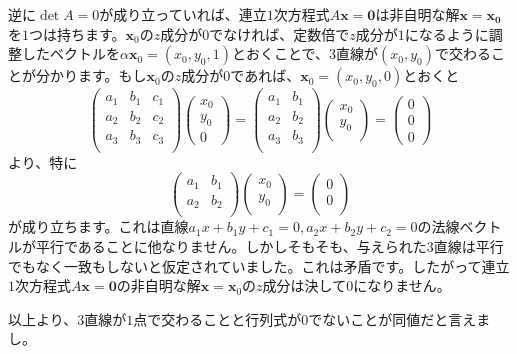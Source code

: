 逆に$\det A = 0$が成り立っていれば、連立$1$次方程式$A\bm{x} = \bm{0}$は非自明な解$\bm{x} = \bm{x_0}$を$1$つは持ちます。$\bm{x}_0$の$z$成分が$0$でなければ、定数倍で$z$成分が$1$になるように調整したベクトルを$\alpha \bm{x}_0 = (x_0, y_0, 1)$とおくことで、$3$直線が$(x_0, y_0)$で交わることが分かります。もし$\bm{x}_0$の$z$成分が$0$であれば、$\bm{x}_0 = (x_0, y_0, 0)$とおくと
\[
\begin{pmatrix}
a_1 & b_1 & c_1 \\
a_2 & b_2 & c_2 \\
a_3 & b_3 & c_3 \\
\end{pmatrix}
\begin{pmatrix}
x_0 \\
y_0 \\
0
\end{pmatrix}
=
\begin{pmatrix}
a_1 & b_1 \\
a_2 & b_2 \\
a_3 & b_3 \\
\end{pmatrix}
\begin{pmatrix}
x_0 \\
y_0 \\
\end{pmatrix}
=
\begin{pmatrix}
0 \\
0 \\
0
\end{pmatrix}
\]
より、特に
\[
\begin{pmatrix}
a_1 & b_1 \\
a_2 & b_2 \\
\end{pmatrix}
\begin{pmatrix}
x_0 \\
y_0 \\
\end{pmatrix}
=
\begin{pmatrix}
0 \\
0 \\
\end{pmatrix}
\]
が成り立ちます。これは直線$a_1 x + b_1 y + c_1 = 0, a_2 x + b_2 y + c_2 = 0$の法線ベクトルが平行であることに他なりません。しかしそもそも、与えられた$3$直線は平行でもなく一致もしないと仮定されていました。これは矛盾です。したがって連立$1$次方程式$A \bm{x} = \bm{0}$の非自明な解$\bm{x} = \bm{x}_0$の$z$成分は決して$0$になりません。

以上より、$3$直線が$1$点で交わることと行列式が$0$でないことが同値だと言えまし。

